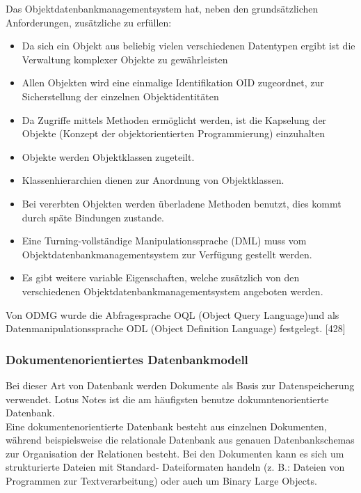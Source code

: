 \documentclass[12pt,a4paper]{report}
\begin{document}
\begin{onehalfspace}
Das Objektdatenbankmanagementsystem hat, neben den grundsätzlichen Anforderungen, zusätzliche zu erfüllen:
\begin{itemize}
\item Da sich ein Objekt aus beliebig vielen verschiedenen Datentypen ergibt ist die Verwaltung komplexer Objekte zu gewährleisten
\item Allen Objekten wird eine einmalige Identifikation OID zugeordnet, zur Sicherstellung der einzelnen Objektidentitäten
\item Da Zugriffe mittels Methoden ermöglicht werden, ist die Kapselung der Objekte (Konzept der objektorientierten Programmierung) einzuhalten
\item Objekte werden Objektklassen zugeteilt.
\item Klassenhierarchien dienen zur Anordnung von Objektklassen.
\item Bei vererbten Objekten werden überladene Methoden benutzt, dies kommt durch späte Bindungen zustande.
\item Eine Turning-vollständige Manipulationssprache (DML) muss vom Objektdatenbankmanagementsystem zur Verfügung gestellt werden.
\item Es gibt weitere variable Eigenschaften, welche zusätzlich von den verschiedenen Objektdatenbankmanagementsystem angeboten werden.
\end{itemize}
Von ODMG wurde die Abfragesprache OQL (Object Query Language)und als Datenmanipulationssprache ODL (Object Definition Language) festgelegt. [428]

\subsubsection{Dokumentenorientiertes Datenbankmodell}
Bei dieser Art von Datenbank werden Dokumente als Basis zur Datenspeicherung verwendet. Lotus Notes ist die am häufigsten benutze dokumntenorientierte Datenbank.\\

Eine dokumentenorientierte Datenbank besteht aus einzelnen Dokumenten, während beispielsweise die relationale Datenbank aus genauen Datenbankschemas zur Organisation der Relationen besteht. Bei den Dokumenten kann es sich um strukturierte Dateien mit Standard- Dateiformaten handeln (z. B.: Dateien von Programmen zur Textverarbeitung) oder auch um Binary Large Objects.\\


\end{onehalfspace}
\end{document}
